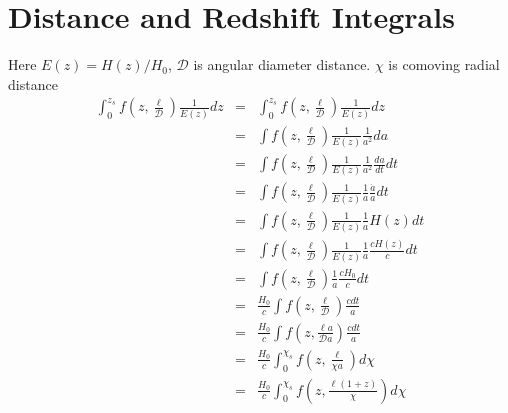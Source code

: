\documentclass[12pt,a4paper]{article}
\begin{document}
	\section{Distance and Redshift Integrals}
			Here $ E(z) = H(z)/H_0$,  $\mathcal{D}$ is angular diameter distance. $\chi$ is comoving radial distance
			\begin{eqnarray}
			\int_0^{z_s} f\left(z, \frac{\ell}{\mathcal{D}}\right) \frac{1}{E(z)} dz & = & \int_0^{z_s} f\left(z, \frac{\ell}{\mathcal{D}}\right) \frac{1}{E(z)} dz \\
			&=& \int f\left(z, \frac{\ell}{\mathcal{D}}\right) \frac{1}{E(z)}  \frac{1}{a^2 }da \\
			&=& \int f\left(z, \frac{\ell}{\mathcal{D}}\right) \frac{1}{E(z)}  \frac{1}{a^2 } \frac{da}{dt}  dt \\
			&=& \int f\left(z, \frac{\ell}{\mathcal{D}}\right) \frac{1}{E(z)}  \frac{1}{a } \frac{\dot{a}}{a}  dt \\
			&=& \int f\left(z, \frac{\ell}{\mathcal{D}}\right) \frac{1}{E(z)}  \frac{1}{a }H(z)  dt \\
			&=& \int f\left(z, \frac{\ell}{\mathcal{D}}\right) \frac{1}{E(z)}  \frac{1}{a } \frac{c H(z)}{c}  dt \\
			&=& \int f\left(z, \frac{\ell}{\mathcal{D}}\right)  \frac{1}{a } \frac{cH_0}{c}  dt \\
			&=& \frac{H_0}{c}\int f\left(z, \frac{\ell}{\mathcal{D}}\right)  \frac{c dt}{a } \\
			&=& \frac{H_0}{c}\int f\left(z, \frac{\ell a}{\mathcal{D} a}\right)  \frac{c dt}{a } \\
			&=& \frac{H_0}{c}\int_0^{\chi_s} f\left(z, \frac{\ell }{\chi a}\right)  d\chi \\
			&=& \frac{H_0}{c}\int_0^{\chi_s} f\left(z, \frac{\ell (1 + z)}{\chi }\right)  d\chi 
			\end{eqnarray}
\end{document}
